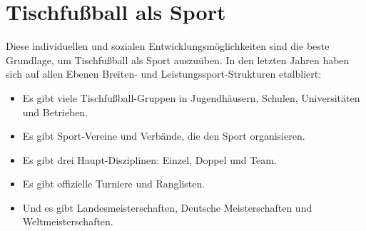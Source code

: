 
\section{Tischfußball als Sport}
\label{einleitung:sport}

Diese individuellen und sozialen Entwicklungsmöglichkeiten sind die beste Grundlage, um Tischfußball als Sport auszuüben. 
In den letzten Jahren haben sich auf allen Ebenen Breiten- und Leistungssport-Strukturen etalbliert:
\begin{itemize}
\item Es gibt viele Tischfußball-Gruppen in Jugendhäusern, Schulen, Universitäten und Betrieben.
\item Es gibt Sport-Vereine und Verbände, die den Sport organisieren.
\item Es gibt drei Haupt-Disziplinen: Einzel, Doppel und Team.
\item Es gibt offizielle Turniere und Ranglisten.
\item Und es gibt Landesmeisterschaften, Deutsche Meisterschaften und Weltmeisterschaften.
\end{itemize}

